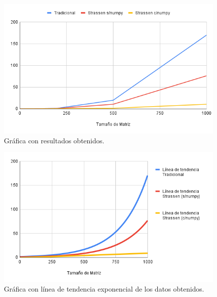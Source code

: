 \documentclass[a4paper,11pt]{article}
\begin{document}
  \begin{minipage}{\linewidth}
      \centering
      \begin{minipage}{0.48\linewidth}
          \begin{figure}[H]
              \includegraphics[width=\linewidth]{Imagenes/graph3.png}
              \caption{Gráfica con resultados obtenidos.}
          \end{figure}
      \end{minipage}
      \hspace{0.05\linewidth}
      \begin{minipage}{0.42\linewidth}
          \begin{figure}[H]
              \includegraphics[width=\linewidth]{Imagenes/graph4.png}
              \caption{Gráfica con línea de tendencia exponencial de los datos obtenidos.}
          \end{figure}
      \end{minipage}
  \end{minipage}
\end{document}
